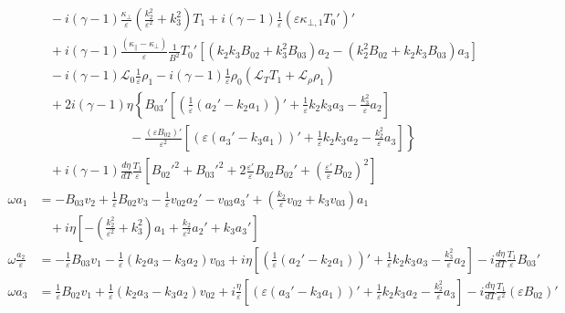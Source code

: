 \documentclass[11pt, fleqn]{article}
\newcommand{\HL}{\mathscr{L}}
\newcommand{\eps}{\varepsilon}
\begin{document}
\begin{align*}
									&~~~~ - i(\gamma - 1)\frac{\kappa_\bot}{\eps}\left(\frac{k_2^2}{\eps^2} + k_3^2\right)T_1 + i(\gamma - 1)\frac{1}{\eps}\left(\eps\kappa_{\bot, 1}T_0'\right)'						\\
									&~~~~ + i(\gamma - 1)\frac{(\kappa_\parallel - \kappa_\bot)}{\eps}\frac{1}{B^2}T_0'\left[\left(k_2k_3B_{02} + k_3^2B_{03}\right)a_2 - \left(k_2^2B_{02} + k_2k_3B_{03}\right)a_3\right]	\\
									&~~~~ - i(\gamma - 1)\HL_0\frac{1}{\eps}\rho_1 - i(\gamma - 1)\frac{1}{\eps}\rho_0\left(\HL_T T_1 + \HL_\rho\rho_1\right)															\\
									&~~~~ +2i(\gamma - 1)\eta\left\{B_{03}'\left[\left(\frac{1}{\eps}\left(a_2' - k_2a_1\right)\right)' + \frac{1}{\eps}k_2k_3a_3 - \frac{k_3^2}{\eps}a_2\right]	\right.				\\
									&~~~~ \left. \qquad\qquad\qquad ~ -\frac{(\eps B_{02})'}{\eps^2}\left[\left(\eps\left(a_3' - k_3a_1\right)\right)' + \frac{1}{\eps}k_2k_3a_2 - \frac{k_2^2}{\eps}a_3\right]\right\} \\
									&~~~~ + i(\gamma - 1)\frac{d\eta}{dT}\frac{T_1}{\eps}\left[B_{02}'^2 + B_{03}'^2 + 2\frac{\eps'}{\eps}B_{02}B_{02}' + \left(\frac{\eps'}{\eps}B_{02}\right)^2\right]				\\[8pt]
	\omega a_1						&= -B_{03}v_2 + \frac{1}{\eps}B_{02}v_3 - \frac{1}{\eps}v_{02}a_2' - v_{03}a_3' + \left(\frac{k_2}{\eps}v_{02} + k_3v_{03}\right)a_1												\\
									&~~~~ +i\eta\left[-\left(\frac{k_2^2}{\eps^2} + k_3^2\right)a_1 + \frac{k_2}{\eps^2}a_2' + k_3a_3'\right]																			\\[8pt]
	\omega \frac{a_2}{\eps}			&= -\frac{1}{\eps}B_{03}v_1 - \frac{1}{\eps}\left(k_2a_3 -k_3a_2\right)v_{03} 
								  + i\eta\left[\left(\frac{1}{\eps}(a_2' - k_2a_1)\right)' + \frac{1}{\eps}k_2k_3a_3 - \frac{k_3^2}{\eps}a_2\right] - i\frac{d\eta}{dT}\frac{T_1}{\eps}B_{03}'							\\[8pt]
	\omega a_3						&= \frac{1}{\eps}B_{02}v_1 + \frac{1}{\eps}\left(k_2a_3 - k_3a_2\right)v_{02}				
								  + i\frac{\eta}{\eps}\left[\left(\eps(a_3' - k_3a_1)\right)' + \frac{1}{\eps}k_2k_3a_2 - \frac{k_2^2}{\eps}a_3\right] - i\frac{d\eta}{dT}\frac{T_1}{\eps^2}(\eps B_{02})'
\end{align*}
\endgroup
\end{document}
